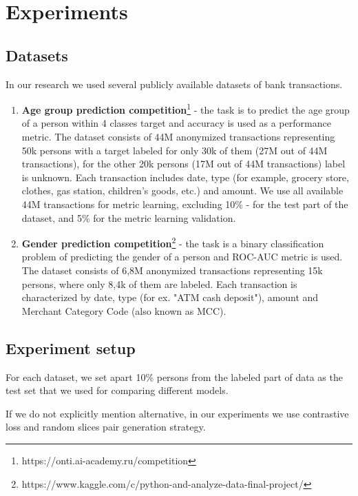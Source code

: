 \documentclass[sigconf, anonymous]{acmart}
\begin{document}
\section{Experiments} \label{sec-exp}

\subsection{Datasets} \label{sec-datasets}
In our research we used several publicly available datasets of bank transactions.
\begin{enumerate}
    \item \textbf{Age group prediction competition}\footnote{https://onti.ai-academy.ru/competition} - the task is to predict the age group of a person within 4 classes target and accuracy is used as a performance metric.
    The dataset consists of 44M anonymized transactions representing 50k persons with a target labeled for only 30k of them (27M out of 44M transactions), for the other 20k persons (17M out of 44M transactions) label is unknown. Each transaction includes date, type (for example, grocery store, clothes, gas station, children's goods, etc.) and amount. We use all available 44M transactions for metric learning, excluding 10\% - for the test part of the dataset, and  5\% for the metric learning validation.
        
    \item \textbf{Gender prediction competition}\footnote{https://www.kaggle.com/c/python-and-analyze-data-final-project/} - the task is a binary classification problem of predicting the gender of a person and ROC-AUC metric is used.
    The dataset consists of 6,8M anonymized transactions representing 15k persons, where only 8,4k of them are labeled. Each transaction is characterized by date, type (for ex. "ATM cash deposit"), amount and Merchant Category Code (also known as MCC).
\end{enumerate}

\subsection{Experiment setup}

For each dataset, we set apart 10\% persons from the labeled part of data as the test set that we used for comparing different models.

If we do not explicitly mention alternative, in our experiments we use contrastive loss and random slices pair generation strategy.
\end{document}

